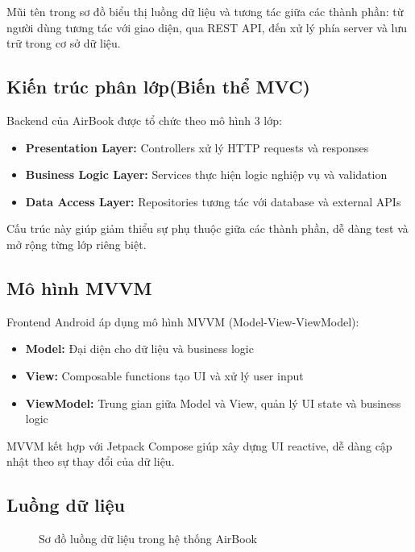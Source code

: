 Mũi tên trong sơ đồ biểu thị luồng dữ liệu và tương tác giữa các thành phần: từ người dùng tương tác với giao diện, qua REST API, đến xử lý phía server và lưu trữ trong cơ sở dữ liệu.

\subsection{Kiến trúc phân lớp(Biến thể MVC)}
Backend của AirBook được tổ chức theo mô hình 3 lớp:

\begin{itemize}[leftmargin=1cm]
    \item \textbf{Presentation Layer:} Controllers xử lý HTTP requests và responses
    \item \textbf{Business Logic Layer:} Services thực hiện logic nghiệp vụ và validation
    \item \textbf{Data Access Layer:} Repositories tương tác với database và external APIs
\end{itemize}

Cấu trúc này giúp giảm thiểu sự phụ thuộc giữa các thành phần, dễ dàng test và mở rộng từng lớp riêng biệt.

\subsection{Mô hình MVVM}
Frontend Android áp dụng mô hình MVVM (Model-View-ViewModel):

\begin{itemize}[leftmargin=1cm]
    \item \textbf{Model:} Đại diện cho dữ liệu và business logic
    \item \textbf{View:} Composable functions tạo UI và xử lý user input
    \item \textbf{ViewModel:} Trung gian giữa Model và View, quản lý UI state và business logic
\end{itemize}

MVVM kết hợp với Jetpack Compose giúp xây dựng UI reactive, dễ dàng cập nhật theo sự thay đổi của dữ liệu.

\subsection{Luồng dữ liệu}

\begin{figure}[H]
\centering
\caption{Sơ đồ luồng dữ liệu trong hệ thống AirBook}
\end{figure}

